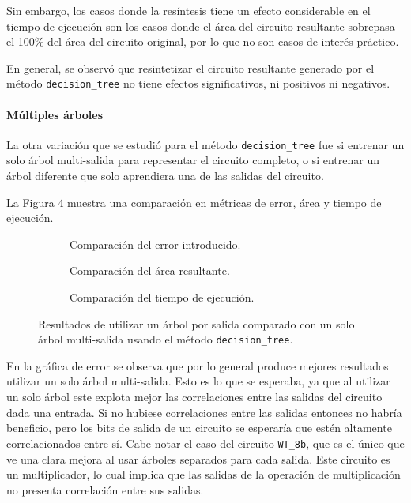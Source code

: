 Sin embargo, los casos donde la resíntesis tiene un efecto considerable en el
tiempo de ejecución son los casos donde el área del circuito resultante
sobrepasa el 100\% del área del circuito original, por lo que no son casos de
interés práctico.

En general, se observó que resintetizar el circuito resultante generado por el
método \texttt{decision\_tree} no tiene efectos significativos, ni positivos ni
negativos.

\paragraph{Múltiples árboles}

La otra variación que se estudió para el método \texttt{decision\_tree} fue si
entrenar un solo árbol multi-salida para representar el circuito completo, o si
entrenar un árbol diferente que solo aprendiera una de las salidas del
circuito.

La Figura \ref{fig:one_tree_per_output} muestra una comparación en métricas de
error, área y tiempo de ejecución.

\begin{figure}
  \centering
  \begin{subfigure}{0.95\textwidth}
    \centering
    
    \caption{Comparación del error introducido.}
    \label{fig:one_tree_per_output_mred}
  \end{subfigure}
  \begin{subfigure}{0.95\textwidth}
    \centering
    
    \caption{Comparación del área resultante.}
    \label{fig:one_tree_per_output_area}
  \end{subfigure}
  \begin{subfigure}{0.95\textwidth}
    \centering
    
    \caption{Comparación del tiempo de ejecución.}
    \label{fig:one_tree_per_output_time}
  \end{subfigure}
  \caption{Resultados de utilizar un árbol por salida comparado con un solo árbol multi-salida usando el método \texttt{decision\_tree}.}
  \label{fig:one_tree_per_output}
\end{figure}

En la gráfica de error se observa que por lo general produce mejores resultados
utilizar un solo árbol multi-salida. Esto es lo que se esperaba, ya que al
utilizar un solo árbol este explota mejor las correlaciones entre las salidas
del circuito dada una entrada. Si no hubiese correlaciones entre las salidas
entonces no habría beneficio, pero los bits de salida de un circuito se
esperaría que estén altamente correlacionados entre sí.
Cabe notar el caso del circuito \texttt{WT\_8b}, que es el único que ve una
clara mejora al usar árboles separados para cada salida. Este circuito es un
multiplicador, lo cual implica que las salidas de la operación de multiplicación
no presenta correlación entre sus salidas.

